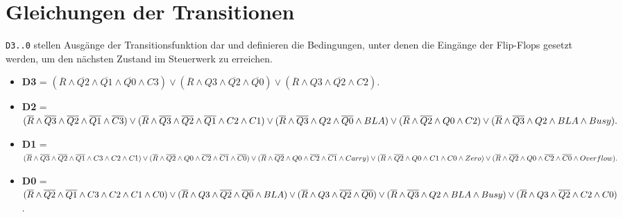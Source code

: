 \section{Gleichungen der Transitionen}
\texttt{D3..0} stellen Ausgänge der Transitionsfunktion dar und definieren die Bedingungen, unter denen
die Eingänge der Flip-Flops gesetzt werden, um den nächsten Zustand im Steuerwerk zu erreichen.
\begin{itemize}
    \item \textbf{D3} = $(\overline{R} \land \overline{Q2} \land \overline{Q1} \land \overline{Q0} \land C3) \lor (\overline{R} \land Q3 \land \overline{Q2} \land \overline{Q0}) \lor (\overline{R} \land Q3 \land \overline{Q2} \land C2).$

    \item \textbf{D2} = $(\overline{R} \land \overline{Q3} \land \overline{Q2} \land \overline{Q1} \land \overline{C3}) \lor (\overline{R} \land \overline{Q3} \land \overline{Q2} \land \overline{Q1} \land C2 \land C1) \lor \\
              (\overline{R} \land \overline{Q3} \land Q2 \land \overline{Q0} \land BLA) \lor (\overline{R} \land \overline{Q2} \land Q0 \land C2) \lor \\
              (\overline{R} \land \overline{Q3} \land Q2 \land BLA \land Busy). $

    \item \textbf{D1} = $(\overline{R} \land \overline{Q3} \land \overline{Q2} \land \overline{Q1} \land C3 \land C2 \land C1) \lor (\overline{R} \land \overline{Q2} \land Q0 \land \overline{C2} \land \overline{C1} \land \overline{C0}) \lor \\
              (\overline{R} \land \overline{Q2} \land Q0 \land \overline{C2} \land \overline{C1} \land Carry) \lor (\overline{R} \land \overline{Q2} \land Q0 \land C1 \land C0 \land Zero) \lor \\
              (\overline{R} \land \overline{Q2} \land Q0 \land \overline{C2} \land \overline{C0} \land Overflow). $

    \item \textbf{D0} = $(\overline{R} \land \overline{Q2} \land \overline{Q1} \land C3 \land C2 \land C1 \land C0) \lor (\overline{R} \land Q3 \land \overline{Q2} \land \overline{Q0} \land BLA) \lor \\
              (\overline{R} \land Q3 \land \overline{Q2} \land \overline{Q0}) \lor (\overline{R} \land \overline{Q3} \land Q2 \land BLA \land Busy) \lor \\
              (\overline{R} \land Q3 \land \overline{Q2} \land C2 \land C0)$.
\end{itemize}



